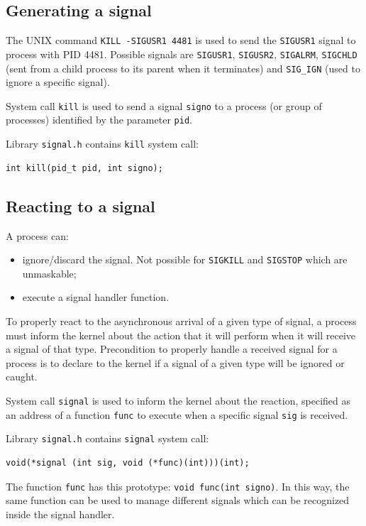 \subsection{Generating a signal}
The UNIX command \texttt{KILL -SIGUSR1 4481} is used to send the \texttt{SIGUSR1} signal to process with PID 4481. Possible signals are \texttt{SIGUSR1}, \texttt{SIGUSR2}, \texttt{SIGALRM}, \texttt{SIGCHLD} (sent from a child process to its parent when it terminates) and \texttt{SIG\_IGN} (used to ignore a specific signal).

System call \texttt{kill} is used to send a signal \texttt{signo} to a process (or group of processes) identified by the parameter \texttt{pid}.

Library \texttt{signal.h} contains \texttt{kill} system call:
\begin{verbatim}
int kill(pid_t pid, int signo);
\end{verbatim}

\subsection{Reacting to a signal}
A process can:
\begin{itemize}
\item ignore/discard the signal. Not possible for \texttt{SIGKILL} and \texttt{SIGSTOP} which are unmaskable;
\item execute a signal handler function.
\end{itemize}
To properly react to the asynchronous arrival of a given type of signal, a process must inform the kernel about the action that it will perform when it will receive a signal of that type. Precondition to properly handle a received signal for a process is to declare to the kernel if a signal of a given type will be ignored or caught.

System call \texttt{signal} is used to inform the kernel about the reaction, specified as an address of a function \texttt{func} to execute when a specific signal \texttt{sig} is received.

Library \texttt{signal.h} contains \texttt{signal} system call:
\begin{verbatim}
void(*signal (int sig, void (*func)(int)))(int);
\end{verbatim}

The function \texttt{func} has this prototype: \texttt{void func(int signo)}. In this way, the same function can be used to manage different signals which can be recognized inside the signal handler.

